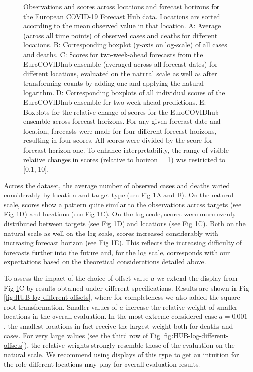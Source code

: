 \documentclass[10pt,letterpaper]{article}
\begin{document}
\begin{figure}[h!]
    \centering
    \caption{Observations and scores across locations and forecast horizons for the European COVID-19 Forecast Hub data. Locations are sorted according to the mean observed value in that location. 
    A: Average (across all time points) of observed cases and deaths for different locations. B: Corresponding boxplot (y-axis on log-scale) of all cases and deaths. C: Scores for two-week-ahead forecasts from the EuroCOVIDhub-ensemble (averaged across all forecast dates) for different locations, evaluated on the natural scale as well as after transforming counts by adding one and applying the natural logarithm. D: Corresponding boxplots of all individual scores of the EuroCOVIDhub-ensemble for two-week-ahead predictions. E: Boxplots for the relative change of scores for the EuroCOVIDhub-ensemble across forecast horizons. For any given forecast date and location, forecasts were made for four different forecast horizons, resulting in four scores. All scores were divided by the score for forecast horizon one. To enhance interpretability, the range of visible relative changes in scores (relative to horizon = 1) was restricted to [0.1, 10].}
    \label{fig:HUB-mean-locations}
\end{figure}

Across the dataset, the average number of observed cases and deaths varied considerably by location and target type (see Fig \ref{fig:HUB-mean-locations}A and B). On the natural scale, scores show a pattern quite similar to the observations across targets (see Fig \ref{fig:HUB-mean-locations}D) and locations (see Fig \ref{fig:HUB-mean-locations}C). On the log scale, scores were more evenly distributed between targets (see Fig \ref{fig:HUB-mean-locations}D) and locations (see Fig \ref{fig:HUB-mean-locations}C). Both on the natural scale as well on the log scale, scores increased considerably with increasing forecast horizon (see Fig \ref{fig:HUB-mean-locations}E). This reflects the increasing difficulty of forecasts further into the future and, for the log scale, corresponds with our expectations based on the theoretical considerations detailed above. 

To assess the impact of the choice of offset value $a$ we extend the display from Fig \ref{fig:HUB-mean-locations}C by results obtained under different specifications. Results are shown in Fig \ref{fig:HUB-log-different-offsets}, where for completeness we also added the square root transformation. Smaller values of $a$ increase the relative weight of smaller locations in the overall evaluation. In the most extreme considered case $a = 0.001$, the smallest locations in fact receive the largest weight both for deaths and cases. For very large values (see the third row of Fig \ref{fig:HUB-log-different-offsets}), the relative weights strongly resemble those of the evaluation on the natural scale. We recommend using displays of this type to get an intuition for the role different locations may play for overall evaluation results.
\end{document}
